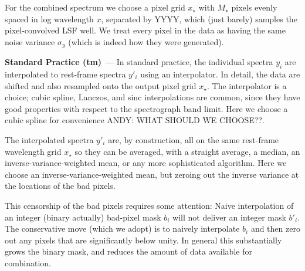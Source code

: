 \documentclass[11pt]{article}
\renewcommand{\paragraph}[1]{\medskip\par\noindent\textbf{#1}~---}
\begin{document}
For the combined spectrum we choose a pixel grid $x_\star$ with $M_\star$ pixels evenly spaced in log wavelength $x$, separated by YYYY, which (just barely) samples the pixel-convolved LSF well.
We treat every pixel in the data as having the same noise variance $\sigma_y$ (which is indeed how they were generated).

\paragraph{Standard Practice (tm)}
In standard practice, the individual spectra $y_i$ are interpolated to rest-frame spectra $y'_i$ using an interpolator.
In detail, the data are shifted and also resampled onto the output pixel grid $x_\star$.
The interpolator is a choice; cubic spline, Lanczos, and sinc interpolations are common, since they have good properties with respect to the spectrograph band limit.
Here we choose a cubic spline for convenience ANDY: WHAT SHOULD WE CHOOSE??.

The interpolated spectra $y'_i$ are, by construction, all on the same rest-frame wavelength grid $x_\star$ so they can be averaged, with a straight average, a median, an inverse-variance-weighted mean, or any more sophisticated algorithm.
Here we choose an inverse-variance-weighted mean, but zeroing out the inverse variance at the locations of the bad pixels.

This censorship of the bad pixels requires some attention:
Naive interpolation of an integer (binary actually) bad-pixel mask $b_i$ will not deliver an integer mask $b'_i$.
The conservative move (which we adopt) is to naively interpolate $b_i$ and then zero out any pixels that are significantly below unity.
In general this substantially grows the binary mask, and reduces the amount of data available for combination.
\end{document}
